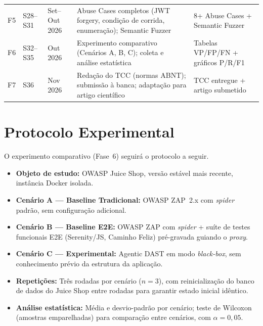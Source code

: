 \documentclass[
    12pt,
    openany,
    oneside,
    a4paper,
    brazil
]{abntex2}
\begin{document}
\begin{longtable}{p{0.6cm}p{1.6cm}p{2.0cm}p{5.2cm}p{3.0cm}}
F5 & S28–S31 & Set–Out 2026 &
Abuse Cases completos (JWT forgery, condição de corrida, enumeração);
Semantic Fuzzer &
8+ Abuse Cases + Semantic Fuzzer \\[4pt]

F6 & S32–S35 & Out 2026 &
Experimento comparativo (Cenários A, B, C); coleta e análise
estatística &
Tabelas VP/FP/FN + gráficos P/R/F1 \\[4pt]

F7 & S36 & Nov 2026 &
Redação do TCC (normas ABNT); submissão à banca; adaptação para artigo
científico &
TCC entregue + artigo submetido \\

\end{longtable}

\section{Protocolo Experimental}

O experimento comparativo (Fase~6) seguirá o protocolo a seguir.

\begin{itemize}
  \item \textbf{Objeto de estudo:} OWASP Juice Shop, versão estável
  mais recente, instância Docker isolada.

  \item \textbf{Cenário A --- Baseline Tradicional:} OWASP ZAP~2.x com
  \textit{spider} padrão, sem configuração adicional.

  \item \textbf{Cenário B --- Baseline E2E:} OWASP ZAP com
  \textit{spider} + suíte de testes funcionais E2E (Serenity/JS,
  Caminho Feliz) pré-gravada guiando o \textit{proxy}.

  \item \textbf{Cenário C --- Experimental:} Agentic DAST em modo
  \textit{black-box}, sem conhecimento prévio da estrutura da
  aplicação.

  \item \textbf{Repetições:} Três rodadas por cenário ($n = 3$), com
  reinicialização do banco de dados do Juice Shop entre rodadas para
  garantir estado inicial idêntico.

  \item \textbf{Análise estatística:} Média e desvio-padrão por
  cenário; teste de Wilcoxon (amostras emparelhadas) para comparação
  entre cenários, com $\alpha = 0{,}05$.
\end{itemize}
\end{document}
